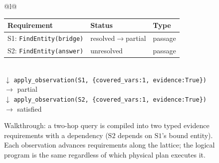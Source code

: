 \begin{figure}[t]
\centering
\begin{tabular}{@{}l@{}}
\begin{tabular}{|l|l|l|}
\hline
\textbf{Requirement} & \textbf{Status} & \textbf{Type} \\
\hline
S1: \texttt{FindEntity(bridge)} & resolved$\to$partial & passage \\
S2: \texttt{FindEntity(answer)} & unresolved & passage \\
\hline
\end{tabular}
\\[4pt]
$\downarrow$ \texttt{apply\_observation(S1, \{covered\_vars:1, evidence:True\})}$\to$ partial \\
$\downarrow$ \texttt{apply\_observation(S2, \{covered\_vars:1, evidence:True\})}$\to$ satisfied
\end{tabular}
\caption{Walkthrough: a two-hop query is compiled into two typed evidence
requirements with a dependency ($\text{S2}$ depends on $\text{S1}$'s bound
entity). Each observation advances requirements along the lattice;
the logical program is the same regardless of which physical plan executes it.}
\label{fig:walkthrough}
\end{figure}
